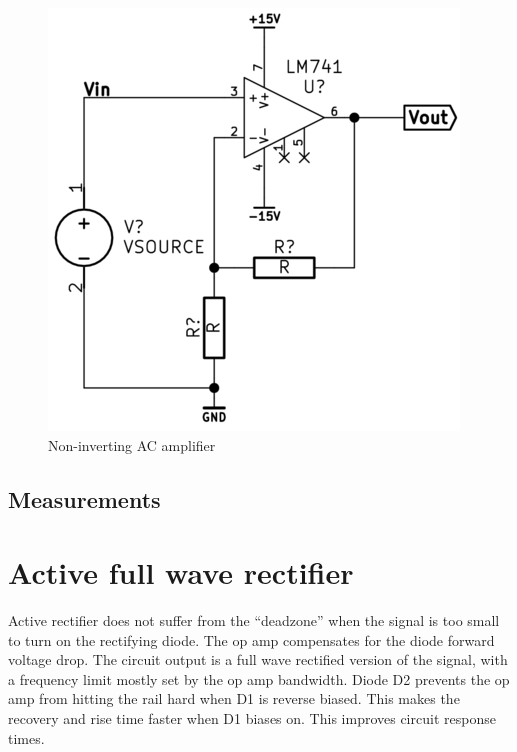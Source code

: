 \documentclass[11pt,a4paper]{article}
\begin{document}
\begin{figure}[htbp]
    \centering
    \includegraphics[scale=0.5]{img/noninvACamp.png}
    \caption{Non-inverting AC amplifier}
    \label{fig:noninvACamp}
\end{figure}


\subsection{Measurements}\label{measurements-3}





\section{Active full wave rectifier}\label{active-full-wave-rectifier}

Active rectifier does not suffer from the ``deadzone'' when the signal
is too small to turn on the rectifying diode. The op amp compensates for
the diode forward voltage drop. The circuit output is a full wave
rectified version of the signal, with a frequency limit mostly set by
the op amp bandwidth. Diode D2 prevents the op amp from hitting the rail
hard when D1 is reverse biased. This makes the recovery and rise time
faster when D1 biases on. This improves circuit response times.
\end{document}
